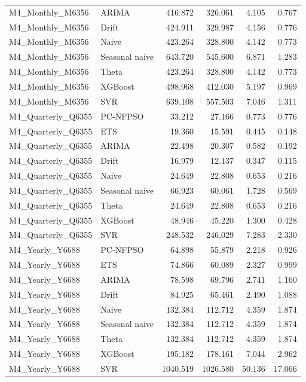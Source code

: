 \begin{longtable}{llrrrr}
M4\_Monthly\_M6356 & ARIMA & 416.872 & 326.061 & 4.105 & 0.767 \\
M4\_Monthly\_M6356 & Drift & 424.911 & 329.987 & 4.156 & 0.776 \\
M4\_Monthly\_M6356 & Naive & 423.264 & 328.800 & 4.142 & 0.773 \\
M4\_Monthly\_M6356 & Seasonal naive & 643.720 & 545.600 & 6.871 & 1.283 \\
M4\_Monthly\_M6356 & Theta & 423.264 & 328.800 & 4.142 & 0.773 \\
M4\_Monthly\_M6356 & XGBoost & 498.968 & 412.030 & 5.197 & 0.969 \\
M4\_Monthly\_M6356 & SVR & 639.108 & 557.503 & 7.046 & 1.311 \\
M4\_Quarterly\_Q6355 & PC-NFPSO & 33.212 & 27.166 & 0.773 & 0.776 \\
M4\_Quarterly\_Q6355 & ETS & 19.360 & 15.591 & 0.445 & 0.148 \\
M4\_Quarterly\_Q6355 & ARIMA & 22.498 & 20.307 & 0.582 & 0.192 \\
M4\_Quarterly\_Q6355 & Drift & 16.979 & 12.137 & 0.347 & 0.115 \\
M4\_Quarterly\_Q6355 & Naive & 24.649 & 22.808 & 0.653 & 0.216 \\
M4\_Quarterly\_Q6355 & Seasonal naive & 66.923 & 60.061 & 1.728 & 0.569 \\
M4\_Quarterly\_Q6355 & Theta & 24.649 & 22.808 & 0.653 & 0.216 \\
M4\_Quarterly\_Q6355 & XGBoost & 48.946 & 45.220 & 1.300 & 0.428 \\
M4\_Quarterly\_Q6355 & SVR & 248.532 & 246.029 & 7.283 & 2.330 \\
M4\_Yearly\_Y6688 & PC-NFPSO & 64.898 & 55.879 & 2.218 & 0.926 \\
M4\_Yearly\_Y6688 & ETS & 74.866 & 60.089 & 2.327 & 0.999 \\
M4\_Yearly\_Y6688 & ARIMA & 78.598 & 69.796 & 2.741 & 1.160 \\
M4\_Yearly\_Y6688 & Drift & 84.925 & 65.461 & 2.490 & 1.088 \\
M4\_Yearly\_Y6688 & Naive & 132.384 & 112.712 & 4.359 & 1.874 \\
M4\_Yearly\_Y6688 & Seasonal naive & 132.384 & 112.712 & 4.359 & 1.874 \\
M4\_Yearly\_Y6688 & Theta & 132.384 & 112.712 & 4.359 & 1.874 \\
M4\_Yearly\_Y6688 & XGBoost & 195.182 & 178.161 & 7.044 & 2.962 \\
M4\_Yearly\_Y6688 & SVR & 1040.519 & 1026.580 & 50.136 & 17.066 \\

\end{longtable}
